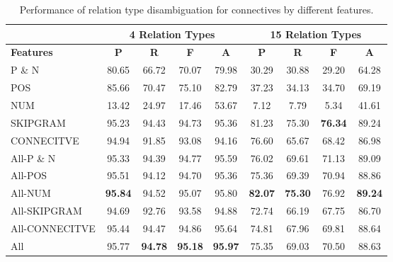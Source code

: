 \begin{table}[ht]
\centering
\begin{tabular}{|l|c|c|c|c|c|c|c|c|}
\hline
                  & \multicolumn{4}{c|}{4 Relation Types}      & \multicolumn{4}{c|}{15 Relation Types}                                    \\ \hline
\bf Features      & \bf P         & \bf R      & \bf F         & \bf A         & \bf P         & \bf R      & \bf F        & \bf A         \\ \hline
    P \& N        &     80.65     &     66.72  &     70.07     &     79.98     &     30.29     &     30.88  &     29.20    &     64.28     \\ \hline
    POS           &     85.66     &     70.47  &     75.10     &     82.79     &     37.23     &     34.13  &     34.70    &     69.19     \\ \hline
    NUM           &     13.42     &     24.97  &     17.46     &     53.67     &      7.12     &      7.79  &      5.34    &     41.61     \\ \hline
    SKIPGRAM      &     95.23     &     94.43  &     94.73     &     95.36     &     81.23     &     75.30  & \bf 76.34    &     89.24     \\ \hline
    CONNECITVE    &     94.94     &     91.85  &     93.08     &     94.16     &     76.60     &     65.67  &     68.42    &     86.98     \\ \hline
    All-P \& N    &     95.33     &     94.39  &     94.77     &     95.59     &     76.02     &     69.61  &     71.13    &     89.09     \\ \hline
    All-POS       &     95.51     &     94.12  &     94.70     &     95.36     &     75.36     &     69.39  &     70.94    &     88.86     \\ \hline
    All-NUM       & \bf 95.84     &     94.52  &     95.07     &     95.80     & \bf 82.07     & \bf 75.30  &     76.92    & \bf 89.24     \\ \hline
    All-SKIPGRAM  &     94.69     &     92.76  &     93.58     &     94.88     &     72.74     &     66.19  &     67.75    &     86.70     \\ \hline
    All-CONNECITVE&     95.44     &     94.47  &     94.86     &     95.64     &     74.81     &     67.96  &     69.81    &     88.64     \\ \hline
    All           &     95.77     & \bf 94.78  & \bf 95.18     & \bf 95.97     &     75.35     &     69.03  &     70.50    &     88.63     \\ \hline

\end{tabular}
\caption{\label{t:sense-features} Performance of relation type
disambiguation for connectives by different features. }
\end{table}

